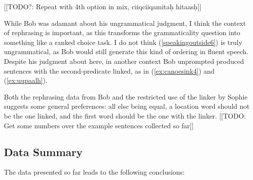 [[TODO?: Repeat with 4th option in mix, ciiqciiqamitaḥ hitaasḥ]]

While Bob was adamant about his ungrammatical judgment, I think the context of rephrasing is important, as this transforms the grammaticality question into something like a ranked choice task. I do not think (\ref{speakingoutside6}) is truly ungrammatical, as Bob would still generate this kind of ordering in fluent speech. Despite his judgment about here, in another context Bob unprompted produced sentences with the second-predicate linked, as in (\ref{ex:canoesink4}) and (\ref{ex:uupaalh}).

Both the rephrasing data from Bob and the restricted use of the linker by Sophie suggests some general preferences: all else being equal, a location word should not be the one linked, and the first word should be the one with the linker. [[TODO: Get some numbers over the example sentences collected so far]]

\subsection{Data Summary}

The data presented so far leads to the following conclusions:

